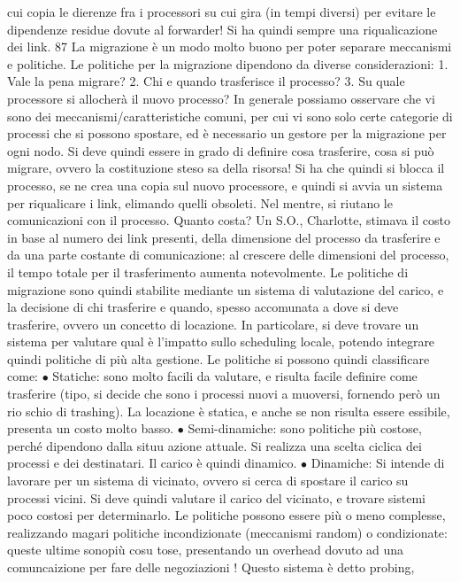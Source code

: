 cui copia le dierenze fra i processori su cui gira (in tempi diversi) per evitare
le dipendenze residue dovute al forwarder! Si ha quindi sempre una riqualicazione dei link.
87
La migrazione è un modo molto buono per poter separare meccanismi e
politiche. Le politiche per la migrazione dipendono da diverse considerazioni:
1. Vale la pena migrare?
2. Chi e quando trasferisce il processo?
3. Su quale processore si allocherà il nuovo processo?
In generale possiamo osservare che vi sono dei meccanismi/caratteristiche comuni, per cui vi sono solo certe categorie
di processi che si possono spostare, ed
è necessario un gestore per la migrazione per ogni nodo. Si deve quindi essere in
grado di definire cosa trasferire, cosa si può migrare, ovvero la costituzione steso
sa della risorsa! Si ha che quindi si blocca il processo, se ne crea una copia sul
nuovo processore, e quindi si avvia un sistema per riqualicare i link, elimando
quelli obsoleti. Nel mentre, si riutano le comunicazioni con il processo.
Quanto costa? Un S.O., Charlotte, stimava il costo in base al numero dei
link presenti, della dimensione del processo da trasferire e da una parte costante
di comunicazione: al crescere delle dimensioni del processo, il tempo totale per
il trasferimento aumenta notevolmente.
Le politiche di migrazione sono quindi stabilite mediante un sistema di valutazione del carico, e la decisione di chi
trasferire e quando, spesso accomunata
a dove si deve trasferire, ovvero un concetto di locazione. In particolare, si deve
trovare un sistema per valutare qual è l'impatto sullo scheduling locale, potendo
integrare quindi politiche di più alta gestione. Le politiche si possono quindi
classificare come:
$\bullet$ Statiche: sono molto facili da valutare, e risulta facile definire come trasferire
(tipo, si decide che sono i processi nuovi a muoversi, fornendo però un rio
schio di trashing). La locazione è statica, e anche se non risulta essere
essibile, presenta un costo molto basso.
$\bullet$ Semi-dinamiche: sono politiche più costose, perché dipendono dalla situu
azione attuale. Si realizza una scelta ciclica dei processi e dei destinatari.
Il carico è quindi dinamico.
$\bullet$ Dinamiche: Si intende di lavorare per un sistema di vicinato, ovvero si
cerca di spostare il carico su processi vicini. Si deve quindi valutare il
carico del vicinato, e trovare sistemi poco costosi per determinarlo.
Le politiche possono essere più o meno complesse, realizzando magari politiche
incondizionate (meccanismi random) o condizionate: queste ultime sonopiù cosu
tose, presentando un overhead dovuto ad una comuncaizione per fare delle negoziazioni ! Questo sistema è detto probing,
